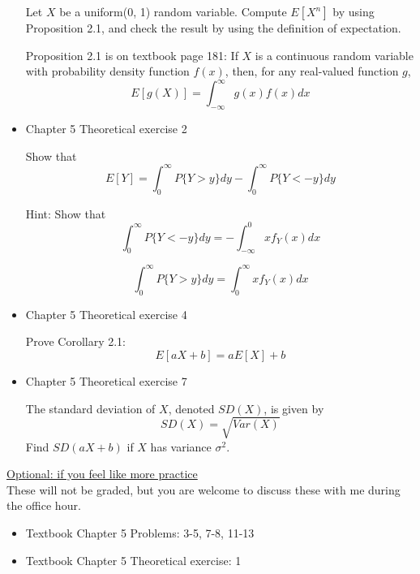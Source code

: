 \documentclass[11pt]{article}
\begin{document}
\begin{itemize}
    Let $X$ be a uniform(0, 1) random variable. Compute $E[X^n]$ by using Proposition 2.1, and check the result by using the definition of expectation. 
    
    Proposition 2.1 is on textbook page 181: If $X$ is a continuous random variable with probability density function $f(x)$, then, for any real-valued function $g$, 
    $$
    E[g(X)] = \int_{-\infty}^{\infty}g(x)f(x)dx
    $$

   
    \item 
    Chapter 5 Theoretical exercise 2
    
    Show that
    $$
    E[Y] = \int_{0}^{\infty} P\{Y > y\} dy - \int_{0}^{\infty}P\{Y < -y\}dy
    $$

    Hint: Show that
    $$
    \int_0^{\infty}P\{Y < -y\}dy = - \int_{-\infty}^{0} x f_Y(x)dx
    $$
    
    $$
    \int_0^{\infty}P\{Y > y\} dy = \int_{0}^{\infty} x f_Y(x)dx
    $$
    
    \item 
    Chapter 5 Theoretical exercise 4
    
    Prove Corollary 2.1: $$E[aX+b] = aE[X] + b$$

    \item 
    Chapter 5 Theoretical exercise 7
    
    The standard deviation of $X$, denoted $SD(X)$, is given by
    $$
    SD(X) = \sqrt{Var(X)}
    $$
    Find $SD(aX+b)$ if $X$ has variance $\sigma^2$.
    
   

\end{itemize}


\vspace{12pt}

\underline{Optional: if you feel like more practice}\\
These will not be graded, but you are welcome to discuss these with me during the office hour.

\begin{itemize}


\item Textbook  Chapter 5 Problems: 3-5, 7-8, 11-13
\item Textbook  Chapter 5 Theoretical exercise: 1

\end{itemize}
\end{document}
